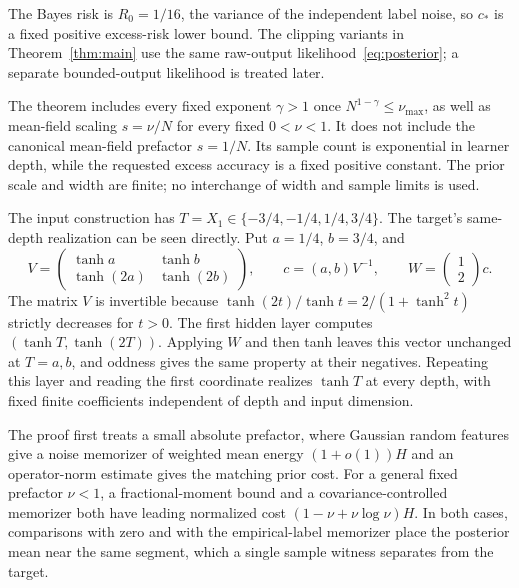 \documentclass[11pt]{article}
\begin{document}
The Bayes risk is $R_0=1/16$, the variance of the independent label noise, so $c_*$ is a fixed positive excess-risk lower bound. The clipping variants in Theorem~\ref{thm:main} use the same raw-output likelihood~\eqref{eq:posterior}; a separate bounded-output likelihood is treated later.

The theorem includes every fixed exponent $\gamma>1$ once $N^{1-\gamma}\le\nu_{\max}$, as well as mean-field scaling $s=\nu/N$ for every fixed $0<\nu<1$. It does not include the canonical mean-field prefactor $s=1/N$. Its sample count is exponential in learner depth, while the requested excess accuracy is a fixed positive constant. The prior scale and width are finite; no interchange of width and sample limits is used.

The input construction has $T=X_1\in\{-3/4,-1/4,1/4,3/4\}$. The target's same-depth realization can be seen directly. Put $a=1/4$, $b=3/4$, and
\[
 V=\begin{pmatrix}\tanh a&\tanh b\\\tanh(2a)&\tanh(2b)\end{pmatrix},
 \qquad c=(a,b)V^{-1},\qquad W=\begin{pmatrix}1\\2\end{pmatrix}c.
\]
The matrix $V$ is invertible because $\tanh(2t)/\tanh t=2/(1+\tanh^2t)$ strictly decreases for $t>0$. The first hidden layer computes $(\tanh T,\tanh(2T))$. Applying $W$ and then tanh leaves this vector unchanged at $T=a,b$, and oddness gives the same property at their negatives. Repeating this layer and reading the first coordinate realizes $\tanh T$ at every depth, with fixed finite coefficients independent of depth and input dimension.

The proof first treats a small absolute prefactor, where Gaussian random features give a noise memorizer of weighted mean energy $(1+o(1))H$ and an operator-norm estimate gives the matching prior cost. For a general fixed prefactor $\nu<1$, a fractional-moment bound and a covariance-controlled memorizer both have leading normalized cost $(1-\nu+\nu\log\nu)H$. In both cases, comparisons with zero and with the empirical-label memorizer place the posterior mean near the same segment, which a single sample witness separates from the target.


















\end{document}
